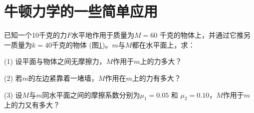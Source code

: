 \section{牛顿力学的一些简单应用}\label{sec:03.05}

\example 已知一个10千克的力$ F $水平地作用于质量为$ M = 6 0 $
千克的物体上，并通过它推另一质量为$ k = 4 0 $千克的物体
(图\ref{fig:03.08})。$ m $与$ M $都在水平面上，求：

(1) 设平面与物体之间无摩擦力，$ M $作用于$ m $上的力多大？

(2) 若$ m $的左边紧靠着一堵墙，$ M $作用在$ m $上的力有多大？

(3) 设$ M $与$ m $同水平面之间的摩擦系数分别为$ \mu _ { 1 } = 0 . 0 5 $ 和
$ \mu _ { 2 } = 0 . 1 0 $，$ M $作用于$ m $上的力又有多大？
\begin{figure}[!h]
  \centering
  \caption{}
  \label{fig:03.08}
\end{figure}

